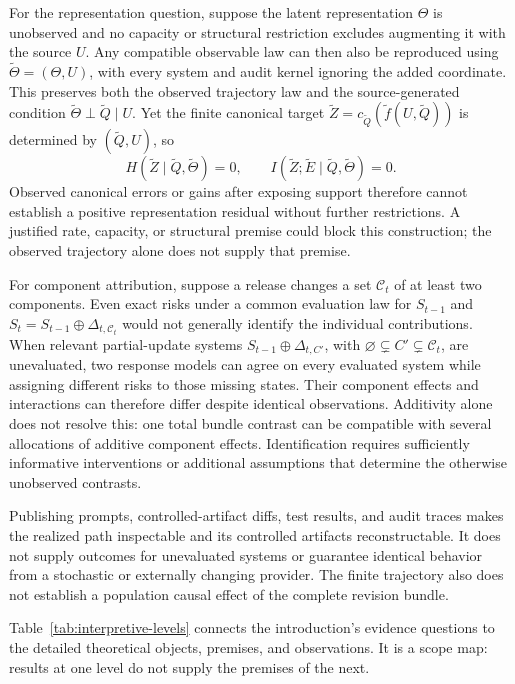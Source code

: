 \documentclass[10pt]{article} %
\providecommand{\1}{\mathbf{1}}  %
\theoremstyle{remark}
\theoremstyle{definition}
\begin{document}
For the representation question, suppose the latent representation
$\Theta$ is unobserved and no capacity or structural restriction excludes
augmenting it with the source $U$. Any compatible observable law can
then also be reproduced using $\widetilde\Theta=(\Theta,U)$, with every
system and audit kernel ignoring the added coordinate. This preserves
both the observed trajectory law and the source-generated condition
$\widetilde\Theta\perp\widetilde Q\mid U$. Yet the finite canonical target
$\widetilde Z=c_{\widetilde Q}(\widetilde f(U,\widetilde Q))$ is determined
by $(\widetilde Q,U)$, so
\[
H(\widetilde Z\mid\widetilde Q,\widetilde\Theta)=0,
\qquad
I(\widetilde Z;\widetilde E\mid\widetilde Q,\widetilde\Theta)=0.
\]
Observed canonical errors or gains after exposing support therefore
cannot establish a positive representation residual without further
restrictions. A justified rate, capacity, or structural premise could
block this construction; the observed trajectory alone does not
supply that premise.

For component attribution, suppose a release changes a set
$\mathcal C_t$ of at least two components. Even exact risks under a
common evaluation law for $S_{t-1}$ and
$S_t=S_{t-1}\oplus\Delta_{t,\mathcal C_t}$ would not generally identify
the individual contributions. When relevant partial-update systems
$S_{t-1}\oplus\Delta_{t,C'}$, with
$\varnothing\subsetneq C'\subsetneq\mathcal C_t$, are unevaluated, two
response models can agree on every evaluated system while assigning
different risks to those missing states. Their component effects and
interactions can therefore differ despite identical observations.
Additivity alone does not resolve this: one total bundle contrast can
be compatible with several allocations of additive component effects.
Identification requires sufficiently informative interventions or
additional assumptions that determine the otherwise unobserved contrasts.

Publishing prompts, controlled-artifact diffs, test results, and audit
traces makes the realized path inspectable and its controlled artifacts
reconstructable. It does not supply outcomes for unevaluated systems or
guarantee identical behavior from a stochastic or externally changing
provider. The finite trajectory also does not establish a population
causal effect of the complete revision bundle.

Table~\ref{tab:interpretive-levels} connects the introduction's evidence
questions to the detailed theoretical objects, premises, and observations.
It is a scope map: results at one level do not supply the premises of the
next.
\end{document}
